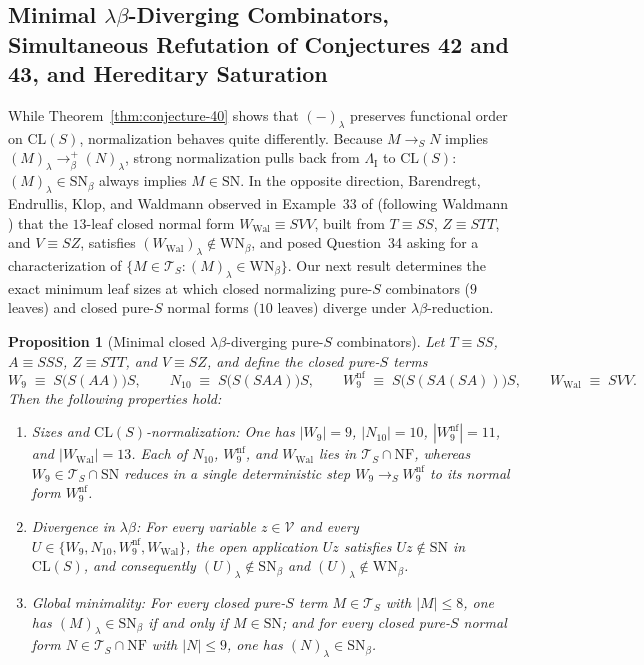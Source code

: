 \documentclass[11pt,reqno]{amsart}
\numberwithin{equation}{section}
\theoremstyle{plain}
\newtheorem{proposition}[theorem]{Proposition}
\theoremstyle{definition}
\theoremstyle{remark}
\newcommand{\CLS}{\mathrm{CL}(S)}
\newcommand{\TS}{\mathcal{T}_S}
\newcommand{\NF}{\mathrm{NF}}
\newcommand{\SN}{\mathrm{SN}}
\newcommand{\WN}{\mathrm{WN}}
\newcommand{\redS}{\to_S}
\begin{document}
\subsection{Minimal \texorpdfstring{$\lambda\beta$}{lambda-beta}-Diverging Combinators, Simultaneous Refutation of Conjectures 42 and 43, and Hereditary Saturation}\label{subsec:conj42-43-refutation}

While Theorem~\ref{thm:conjecture-40} shows that $(-)_\lambda$ preserves functional order on $\CLS$, normalization behaves quite differently. Because $M \redS N$ implies $(M)_\lambda \to_\beta^+ (N)_\lambda$, strong normalization pulls back from $\Lambda_{\mathrm{I}}$ to $\CLS$: $(M)_\lambda \in \SN_\beta$ always implies $M \in \SN$. In the opposite direction, Barendregt, Endrullis, Klop, and Waldmann observed in Example~33 of \cite[p.~95]{BarendregtEndrullisKlopWaldmann2017} (following Waldmann \cite{Waldmann2000}) that the $13$-leaf closed normal form $W_{\mathrm{Wal}} \equiv S V V$, built from $T \equiv S S$, $Z \equiv S T T$, and $V \equiv S Z$, satisfies $(W_{\mathrm{Wal}})_\lambda \notin \WN_\beta$, and posed Question~34 asking for a characterization of $\{M \in \TS : (M)_\lambda \in \WN_\beta\}$. Our next result determines the exact minimum leaf sizes at which closed normalizing pure-$S$ combinators ($9$ leaves) and closed pure-$S$ normal forms ($10$ leaves) diverge under $\lambda\beta$-reduction.

\begin{proposition}[Minimal closed $\lambda\beta$-diverging pure-$S$ combinators]\label{prop:minimal-lambda-divergers}
Let $T \equiv S S$, $A \equiv S S S$, $Z \equiv S T T$, and $V \equiv S Z$, and define the closed pure-$S$ terms
\[
  W_9 \;\equiv\; S\bigl(S(A A)\bigr)S, \qquad N_{10} \;\equiv\; S\bigl(S(S A A)\bigr)S, \qquad W_9^{\mathrm{nf}} \;\equiv\; S\bigl(S(S A (S A))\bigr)S, \qquad W_{\mathrm{Wal}} \;\equiv\; S V V.
\]
Then the following properties hold:
\begin{enumerate}[label=(\roman*),leftmargin=2.2em]
  \item \emph{Sizes and $\CLS$-normalization:} One has $|W_9| = 9$, $|N_{10}| = 10$, $|W_9^{\mathrm{nf}}| = 11$, and $|W_{\mathrm{Wal}}| = 13$. Each of $N_{10}$, $W_9^{\mathrm{nf}}$, and $W_{\mathrm{Wal}}$ lies in $\TS \cap \NF$, whereas $W_9 \in \TS \cap \SN$ reduces in a single deterministic step $W_9 \redS W_9^{\mathrm{nf}}$ to its normal form $W_9^{\mathrm{nf}}$.
  \item \emph{Divergence in $\lambda\beta$:} For every variable $z \in \mathcal{V}$ and every $U \in \{W_9, N_{10}, W_9^{\mathrm{nf}}, W_{\mathrm{Wal}}\}$, the open application $U z$ satisfies $U z \notin \SN$ in $\CLS$, and consequently $(U)_\lambda \notin \SN_\beta$ and $(U)_\lambda \notin \WN_\beta$.
  \item \emph{Global minimality:} For every closed pure-$S$ term $M \in \TS$ with $|M| \le 8$, one has $(M)_\lambda \in \SN_\beta$ if and only if $M \in \SN$; and for every closed pure-$S$ normal form $N \in \TS \cap \NF$ with $|N| \le 9$, one has $(N)_\lambda \in \SN_\beta$.
\end{enumerate}
\end{proposition}
\end{document}
